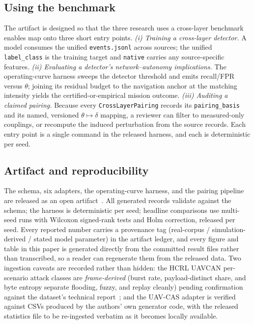 \documentclass[conference]{IEEEtran}
\newcommand{\dataset}[1]{\textsc{#1}}
\newcommand{\code}[1]{\texttt{#1}}
\begin{document}
\subsection{Using the benchmark}
The artifact is designed so that the three research uses a cross-layer benchmark
enables map onto three short entry points. \emph{(i) Training a cross-layer
detector.} A model consumes the unified \code{events.jsonl} across sources; the
unified \code{label\_class} is the training target and \code{native} carries any
source-specific features. \emph{(ii) Evaluating a detector's network--autonomy
implications.} The operating-curve harness sweeps the detector threshold and
emits recall/FPR versus $\theta$; joining its residual budget to the navigation
anchor at the matching intensity yields the certified-or-empirical mission
outcome. \emph{(iii) Auditing a claimed pairing.} Because every
\code{CrossLayerPairing} records its \code{pairing\_basis} and its named,
versioned $\theta\!\mapsto\!\delta$ mapping, a reviewer can filter to
measured-only couplings, or recompute the induced perturbation from the source
records. Each entry point is a single command in the released harness, and each
is deterministic per seed.

\subsection{Artifact and reproducibility}
The schema, six adapters, the operating-curve harness, and the pairing pipeline
are released as an open artifact~\cite{robustuavs2026}. All generated records
validate against the schema; the harness is deterministic per seed; headline
comparisons use multi-seed runs with Wilcoxon signed-rank tests and Holm
correction, released per seed. Every reported number carries a provenance tag
(real-corpus / simulation-derived / stated model parameter) in the artifact
ledger, and every figure and table in this paper is generated directly from the
committed result files rather than transcribed, so a reader can regenerate them
from the released data. Two ingestion caveats are recorded rather than hidden:
the \dataset{HCRL UAVCAN} per-scenario attack classes are \emph{frame-derived}
(burst rate, payload-distinct share, and byte entropy separate flooding, fuzzy,
and replay cleanly) pending confirmation against the dataset's technical
report~\cite{hcrl_uavcan}; and the \dataset{UAV-CAS} adapter is verified
against CSVs produced by the authors' own generator code, with the released
statistics file to be re-ingested verbatim as it becomes locally available.
\end{document}
